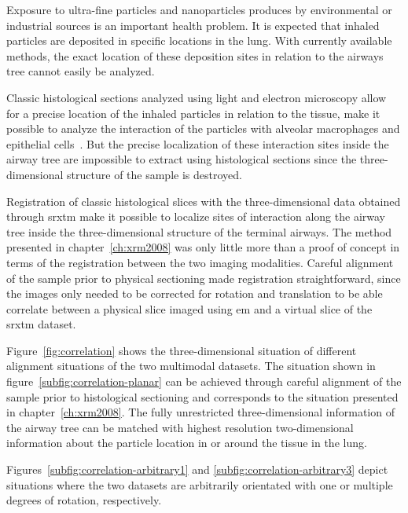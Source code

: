 Exposure to ultra-fine particles and nanoparticles produces by environmental or industrial sources is an important health problem. It is expected that inhaled particles are deposited in specific locations in the lung. With currently available methods, the exact location of these deposition sites in relation to the airways tree cannot easily be analyzed. 

Classic histological sections analyzed using light and electron microscopy allow for a precise location of the inhaled particles in relation to the tissue, \ie make it possible to analyze the interaction of the particles with alveolar macrophages and epithelial cells~\cite{Muhlfeld2008}. But the precise localization of these interaction sites inside the airway tree are impossible to extract using histological sections since the three-dimensional structure of the sample is destroyed.

Registration of classic histological slices with the three-dimensional data obtained through \ac{srxtm} make it possible to localize sites of interaction along the airway tree inside the three-dimensional structure of the terminal airways. The method presented in chapter~\ref{ch:xrm2008} was only little more than a proof of concept in terms of the registration between the two imaging modalities. Careful alignment of the sample prior to physical sectioning made registration straightforward, since the images only needed to be corrected for rotation and translation to be able correlate between a physical slice imaged using \ac{em} and a virtual slice of the \ac{srxtm} dataset.

Figure~\ref{fig:correlation} shows the three-dimensional situation of different alignment situations of the two multimodal datasets. The situation shown in figure~\ref{subfig:correlation-planar} can be achieved through careful alignment of the sample prior to histological sectioning and corresponds to the situation presented in chapter~\ref{ch:xrm2008}. The fully unrestricted three-dimensional information of the airway tree can be matched with highest resolution two-dimensional information about the particle location in or around the tissue in the lung.

Figures~\ref{subfig:correlation-arbitrary1} and \ref{subfig:correlation-arbitrary3} depict situations where the two datasets are arbitrarily orientated with one or multiple degrees of rotation, respectively.

